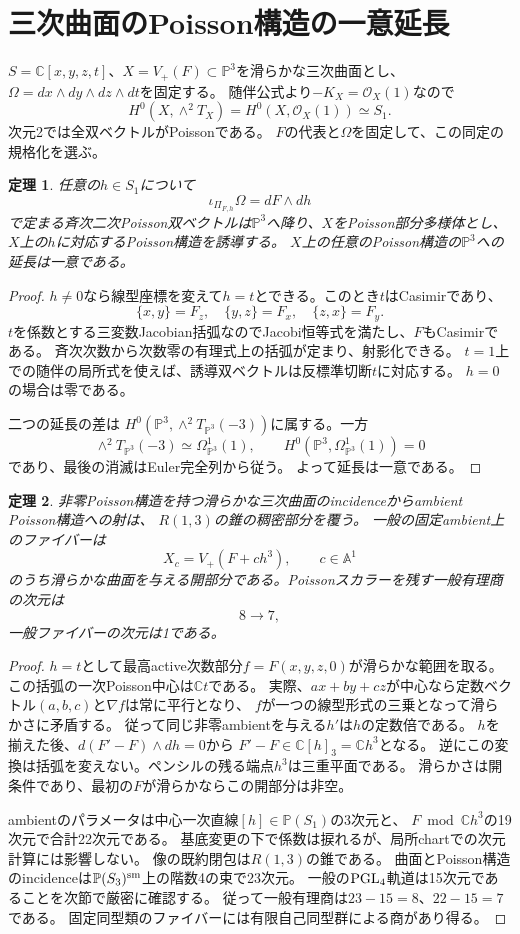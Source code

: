 \documentclass[11pt,a4paper]{ltjsarticle}
\newtheorem{theorem}{定理}[section]
\theoremstyle{definition}\newtheorem{remark}[theorem]{注意}
\newcommand{\PP}{\mathbb P}\newcommand{\kk}{\mathbb C}
\newcommand{\OO}{\mathcal O}\newcommand{\rank}{\operatorname{rank}}
\begin{document}

\section{三次曲面のPoisson構造の一意延長}
$S=\kk[x,y,z,t]$、$X=V_+(F)\subset\PP^3$を滑らかな三次曲面とし、
$\Omega=dx\wedge dy\wedge dz\wedge dt$を固定する。
随伴公式より$-K_X=\OO_X(1)$なので
\[
 H^0(X,\wedge^2T_X)=H^0(X,\OO_X(1))\simeq S_1.
\]
次元2では全双ベクトルがPoissonである。
$F$の代表と$\Omega$を固定して、この同定の規格化を選ぶ。

\begin{theorem}\label{thm:extension}
任意の$h\in S_1$について
\[
 \iota_{\Pi_{F,h}}\Omega=dF\wedge dh
\]
で定まる斉次二次Poisson双ベクトルは$\PP^3$へ降り、$X$をPoisson部分多様体とし、
$X$上の$h$に対応するPoisson構造を誘導する。
$X$上の任意のPoisson構造の$\PP^3$への延長は一意である。
\end{theorem}
\begin{proof}
$h\ne0$なら線型座標を変えて$h=t$とできる。このとき$t$はCasimirであり、
\[
 \{x,y\}=F_z,\quad\{y,z\}=F_x,\quad\{z,x\}=F_y.
\]
$t$を係数とする三変数Jacobian括弧なのでJacobi恒等式を満たし、$F$もCasimirである。
斉次次数から次数零の有理式上の括弧が定まり、射影化できる。
$t=1$上での随伴の局所式を使えば、誘導双ベクトルは反標準切断$t$に対応する。
$h=0$の場合は零である。

二つの延長の差は
$H^0(\PP^3,\wedge^2T_{\PP^3}(-3))$に属する。一方
\[
 \wedge^2T_{\PP^3}(-3)\simeq\Omega^1_{\PP^3}(1),\qquad
 H^0(\PP^3,\Omega^1_{\PP^3}(1))=0
\]
であり、最後の消滅はEuler完全列から従う。
よって延長は一意である。
\end{proof}

\begin{theorem}\label{thm:poisson-fiber}
非零Poisson構造を持つ滑らかな三次曲面のincidenceからambient Poisson構造への射は、
$R(1,3)$の錐の稠密部分を覆う。
一般の固定ambient上のファイバーは
\[
 X_c=V_+(F+c h^3),\qquad c\in\mathbb A^1
\]
のうち滑らかな曲面を与える開部分である。Poissonスカラーを残す一般有理商の次元は
\[
 8\longrightarrow7,
\]
一般ファイバーの次元は1である。
\end{theorem}
\begin{proof}
$h=t$として最高active次数部分$f=F(x,y,z,0)$が滑らかな範囲を取る。
この括弧の一次Poisson中心は$\kk t$である。
実際、$a x+b y+c z$が中心なら定数ベクトル$(a,b,c)$と$\nabla f$は常に平行となり、
$f$が一つの線型形式の三乗となって滑らかさに矛盾する。
従って同じ非零ambientを与える$h'$は$h$の定数倍である。
$h$を揃えた後、$d(F'-F)\wedge dh=0$から
$F'-F\in\kk[h]_3=\kk h^3$となる。
逆にこの変換は括弧を変えない。ペンシルの残る端点$h^3$は三重平面である。
滑らかさは開条件であり、最初の$F$が滑らかならこの開部分は非空。

ambientのパラメータは中心一次直線$[h]\in\PP(S_1)$の3次元と、
$F\bmod\kk h^3$の19次元で合計22次元である。
基底変更の下で係数は捩れるが、局所chartでの次元計算には影響しない。
像の既約閉包は$R(1,3)$の錐である\cite[\S3.4]{Pym}。
曲面とPoisson構造のincidenceは$\PP(S_3)^{\rm sm}$上の階数4の束で23次元。
一般の$\operatorname{PGL}_4$軌道は15次元であることを次節で厳密に確認する。
従って一般有理商は$23-15=8$、$22-15=7$である。
固定同型類のファイバーには有限自己同型群による商があり得る。
\end{proof}
\end{document}
